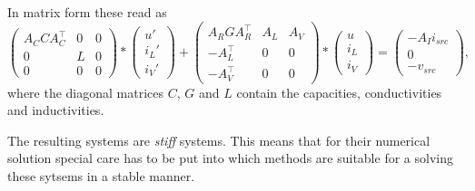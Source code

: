 In matrix form these read as
\begin{equation}
	\label{MNA_Matrixform}
	\begin{pmatrix}
		A_C C A_C^\top & 0 & 0 \\
		0 & L & 0 \\
		0 & 0 & 0
	\end{pmatrix}
	*
	\begin{pmatrix}
		u' \\
		i_L' \\
		i_V'
	\end{pmatrix}
	+
	\begin{pmatrix}
		A_R G A_R^\top & A_L & A_V \\
		-A_L^\top & 0 & 0 \\
		-A_V^\top & 0 & 0 
	\end{pmatrix}
	*
	\begin{pmatrix}
		u \\
		i_L \\
		i_V
	\end{pmatrix}
	=
	\begin{pmatrix}
		-A_I i_{src} \\
		0 \\
		-v_{src}
	\end{pmatrix} , 
\end{equation}
where the diagonal matrices $C$, $G$ and $L$ contain the capacities, conductivities and inductivities.

The resulting systems are \emph{stiff} systems. This means that for their numerical solution special care has to be put into which methods are suitable for a solving these sytsems in a stable manner.


